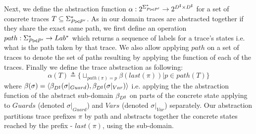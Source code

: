 Next, we define the abstraction function $\alpha : 2^{\Sigma^{*}_{P \bowtie P'}} \rightarrow 2^{D^\sharp \times D^\sharp}$ for a set of concrete traces $T \subseteq \Sigma^{*}_{P \bowtie P'}$. As in our domain traces are abstracted together if they share the exact same path, we first define an operation $path : \Sigma^{*}_{P \bowtie P'} \rightarrow Lab^{*}$ which returns a sequence of labels for a trace's states i.e. what is the path taken by that trace. We also allow applying $path$ on a set of traces to denote the set of paths resulting by applying the function of each of the traces. Finally we define the trace abstraction as following:
\[
\alpha(T) \triangleq \{ \sqcup_{path(\pi)=p} \beta(last(\pi)) | p \in path(T) \}
\]
where $\beta(\sigma) = \langle \beta_{D^\sharp}(\sigma|_{Guard}), \beta_{D^\sharp}(\sigma|_{Var}) \rangle$  i.e. applying the the abstraction function of the abstract sub-domain $\beta_{D^\sharp}$ on parts of the concrete state applying to $Guards$ (denoted $\sigma|_{Guard}$) and $Vars$ (denoted $\sigma|_{Var}$) separately. Our abstraction partitions trace prefixes $\pi$ by path and abstracts together the concrete states reached by the prefix - $last(\pi)$, using the sub-domain.

